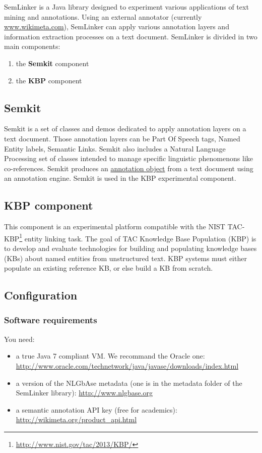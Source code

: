 \documentclass[11pt]{article}
\newcommand{\seml}{SemLinker}
\newcommand{\semk}{Semkit}
\begin{document}
\seml{} is a Java library designed to experiment various applications of text mining and annotations. 
Using an external annotator (currently \url{www.wikimeta.com}), \seml{} can apply various annotation layers and information extraction processes on a text document. 
\seml{} is divided in two main components: 
\begin{enumerate}
 \item the \textbf{\semk{}} component
 \item the \textbf{KBP} component
\end{enumerate}

\subsection{\semk{}}
\label{ssec:semk}
\semk{} is a set of classes and demos dedicated to apply annotation layers on a text document. 
Those annotation layers can be Part Of Speech tags, Named Entity labels, Semantic Links. 
\semk{} also includes a Natural Language Processing set of classes intended to manage specific linguistic phenomenons like co-references. 
\semk{} produces an \underline{annotation object} from a text document using an annotation engine. \semk{} is used in the KBP experimental component.

\subsection{KBP component}
\label{ssec:kbpcomp}
This component is an experimental platform compatible with the NIST TAC-KBP\footnote{\url{http://www.nist.gov/tac/2013/KBP/}} entity linking task. 
The goal of TAC Knowledge Base Population (KBP) is to develop and evaluate technologies for building and populating knowledge bases (KBs) about named entities from unstructured text. KBP systems must either populate an existing reference KB, or else build a KB from scratch. 

\subsection{Configuration}
\label{ssec:config}

\subsubsection{Software requirements}
\label{sssec:softreqs}
You need:
\begin{itemize}
 \item a true Java 7 compliant VM. We recommand the Oracle one: \url{http://www.oracle.com/technetwork/java/javase/downloads/index.html} 
 \item a version of the NLGbAse metadata (one is in the metadata folder of the \seml{} library): \url{http://www.nlgbase.org} 
 \item a semantic annotation API key (free for academics): \url{http://wikimeta.org/product_api.html}
\end{itemize}
\end{document}
